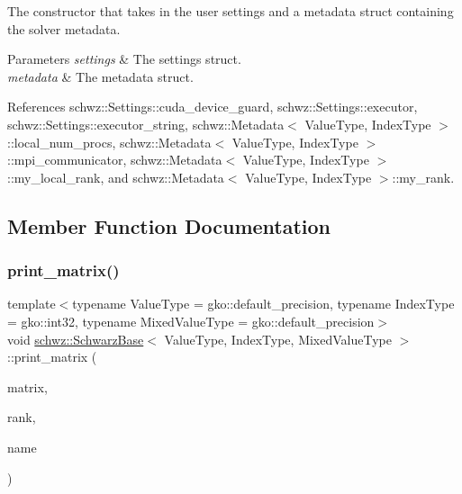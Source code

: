 The constructor that takes in the user settings and a metadata struct containing the solver metadata. 


\begin{DoxyParams}{Parameters}
{\em settings} & The settings struct. \\
\hline
{\em metadata} & The metadata struct. \\
\hline
\end{DoxyParams}


References schwz\+::\+Settings\+::cuda\+\_\+device\+\_\+guard, schwz\+::\+Settings\+::executor, schwz\+::\+Settings\+::executor\+\_\+string, schwz\+::\+Metadata$<$ Value\+Type, Index\+Type $>$\+::local\+\_\+num\+\_\+procs, schwz\+::\+Metadata$<$ Value\+Type, Index\+Type $>$\+::mpi\+\_\+communicator, schwz\+::\+Metadata$<$ Value\+Type, Index\+Type $>$\+::my\+\_\+local\+\_\+rank, and schwz\+::\+Metadata$<$ Value\+Type, Index\+Type $>$\+::my\+\_\+rank.



\subsection{Member Function Documentation}
\mbox{\label{classschwz_1_1SchwarzBase_a835d94bb5649850365f6adab8983754e}} 
\subsubsection{\texorpdfstring{print\+\_\+matrix()}{print\_matrix()}}
{\footnotesize\ttfamily template$<$typename Value\+Type  = gko\+::default\+\_\+precision, typename Index\+Type  = gko\+::int32, typename Mixed\+Value\+Type  = gko\+::default\+\_\+precision$>$ \\
void \hyperlink{classschwz_1_1SchwarzBase}{schwz\+::\+Schwarz\+Base}$<$ Value\+Type, Index\+Type, Mixed\+Value\+Type $>$\+::print\+\_\+matrix (\begin{DoxyParamCaption}\item[{const std\+::shared\+\_\+ptr$<$ gko\+::matrix\+::\+Csr$<$ Value\+Type, Index\+Type $>$$>$ \&}]{matrix,  }\item[{int}]{rank,  }\item[{std\+::string}]{name }\end{DoxyParamCaption})}




